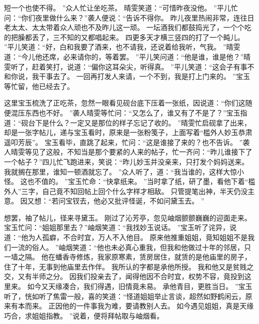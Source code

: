 短一个也使不得。
”众人忙让坐吃茶。
晴雯笑道：“可惜昨夜没他。
”平儿忙问：“你们夜里做什么来？”袭人便说：“告诉不得你。
昨儿夜里热闹非常，连往日老太太、太太带着众人顽也不及昨儿这一顽。
一坛酒我们都鼓捣光了，一个个吃的把臊都丢了，三不知的又都唱起来。
四更多天才横三竖四的打了一个盹儿。
”平儿笑道：“好，白和我要了酒来，也不请我，还说着给我听，气我。
”晴雯道：“今儿他还席，必来请你的，等着罢。
”平儿笑问道：“他是谁，谁是他？”晴雯听了，赶着笑打，说道：“偏你这耳朵尖，听得真。
”平儿笑道：“这会子有事不和你说，我干事去了。
一回再打发人来请，一个不到，我是打上门来的。
”宝玉等忙留，他已经去了。
\par
这里宝玉梳洗了正吃茶，忽然一眼看见砚台底下压着一张纸，因说道：“你们这随便混压东西也不好。
”袭人晴雯等忙问：“又怎么了，谁又有了不是了？”宝玉指道：“砚台下是什么？一定又是那位的样子忘记了收的。
”晴雯忙启砚拿了出来，却是一张字帖儿，递与宝玉看时，原来是一张粉笺子，上面写着“槛外人妙玉恭肃遥叩芳辰”。
宝玉看毕，直跳了起来，忙问：“这是谁接了来的？也不告诉。
”袭人晴雯等见了这般，不知当是那个要紧的人来的帖子，忙一齐问：“昨儿谁接下了一个帖子？”四儿忙飞跑进来，笑说：“昨儿妙玉并没亲来，只打发个妈妈送来。
我就搁在那里，谁知一顿酒就忘了。
”众人听了，道：“我当谁的，这样大惊小怪。
这也不值的。
”宝玉忙命：“快拿纸来。
”当时拿了纸，研了墨，看他下着“槛外人”三字，自己竟不知回帖上回个什么字样才相敌。
只管提笔出神，半天仍没主意。
因又想：“若问宝钗去，他必又批评怪诞，不如问黛玉去。
”\par
想罢，袖了帖儿，径来寻黛玉。
刚过了沁芳亭，忽见岫烟颤颤巍巍的迎面走来。
宝玉忙问：“姐姐那里去？”岫烟笑道：“我找妙玉说话。
”宝玉听了诧异，说道：“他为人孤癖，不合时宜，万人不入他目。
原来他推重姐姐，竟知姐姐不是我们一流的俗人。
”岫烟笑道：“他也未必真心重我，但我和他做过十年的邻居，只一墙之隔。
他在蟠香寺修炼，我家原寒素，赁房居住，就赁的是他庙里的房子，住了十年，无事到他庙里去作伴。
我所认的字都是承他所授。
我和他又是贫贱之交，又有半师之分。
因我们投亲去了，闻得他因不合时宜，权势不容，竟投到这里来。
如今又天缘凑合，我们得遇，旧情竟未易。
承他青目，更胜当日。
”宝玉听了，恍如听了焦雷一般，喜的笑道：“怪道姐姐举止言谈，超然如野鹤闲云，原来有本而来。
正因他的一件事我为难，要请教别人去。
如今遇见姐姐，真是天缘巧合，求姐姐指教。
”说着，便将拜帖取与岫烟看。
